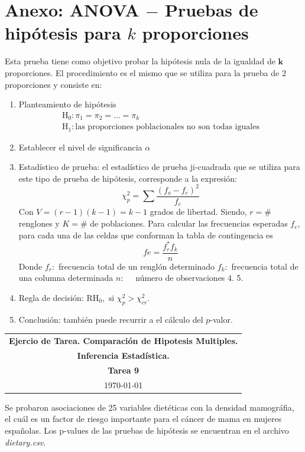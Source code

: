 \documentclass[11pt,letterpaper]{article}
\begin{document}
\section{Anexo: ANOVA $-$ Pruebas de hipótesis para $k$ proporciones}\label{anexo}
Esta prueba tiene como objetivo probar la hipótesis nula de la igualdad de $\boldsymbol{k}$ proporciones. El procedimiento es el mismo que se utiliza para la prueba de 2 proporciones y consiste en:
\begin{enumerate}[I]
	\item Planteamiento de hipótesis
	$$
	\begin{array}{l}
		\mathrm{H}_{0}: \pi_{1}=\pi_{2}=\ldots =\pi_{k} \\
		\mathrm{H}_{1}: \text{las proporciones poblacionales no son todas iguales}
	\end{array}
	$$
	\item Establecer el nivel de significancia $\alpha$
	\item Estadístico de prueba: el estadístico de prueba ji-cuadrada que se utiliza
	para este tipo de prueba de hipótesis, corresponde a la expresión:
	$$
	\chi_{p}^{2}=\sum \frac{(f_o-f_e)^{2}}{f_e}
	$$
	Con $V=(r-1)(k-1)=k-1$ grados de libertad.
	Siendo, $r= \#$ renglones y $K=\#$ de poblaciones. 	Para calcular las frecuencias esperadas $f_{e}$, para cada una de las celdas que conforman la tabla de
	contingencia es
	$$
	f e=\frac{f_{r}^{*} f_{k}}{n}
	$$
	Donde
	$f_{r}:$ frecuencia total de un renglón determinado
	$f_{k}:$ frecuencia total de una columna determinada
	$n: \quad$ número de observaciones
	4. 
	5. 
	\item Regla de decisión:	$\mathrm{RH}_{0}, \text{ si } \chi_{p}^{2}>\chi_{c r}^{2}$.
	\item Conclusión: también puede recurrir a el cálculo del $p$-valor.
\end{enumerate}

\newpage
\begin{table}[ht]
\centering
\begin{tabular}{c}
\textbf{Ejercio de Tarea. Comparación de Hipotesis Multiples.}\\
\textbf{Inferencia Estadística.} \\
\textbf{Tarea 9}\\
\today
\end{tabular}
\end{table}

Se probaron asociaciones de 25 variables dietéticas  con la densidad mamográfia, el cuál es un factor de riesgo importante para el cáncer de mama en mujeres españolas. Los p-values de las pruebas de hipótesis se encuentran en el archivo \textit{dietary.csv}.\\
\end{document}
